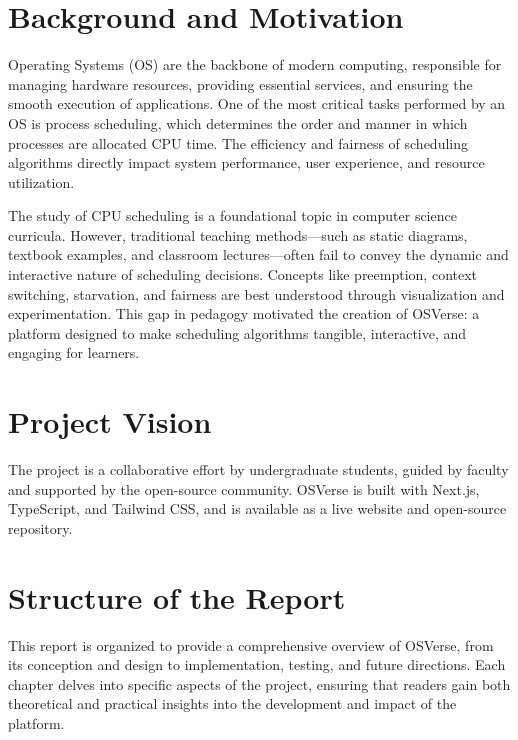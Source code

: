 \documentclass[12pt,a4paper,oneside]{report}
\begin{document}
\section*{Background and Motivation}
Operating Systems (OS) are the backbone of modern computing, responsible for managing hardware resources, providing essential services, and ensuring the smooth execution of applications. One of the most critical tasks performed by an OS is process scheduling, which determines the order and manner in which processes are allocated CPU time. The efficiency and fairness of scheduling algorithms directly impact system performance, user experience, and resource utilization.

The study of CPU scheduling is a foundational topic in computer science curricula. However, traditional teaching methods—such as static diagrams, textbook examples, and classroom lectures—often fail to convey the dynamic and interactive nature of scheduling decisions. Concepts like preemption, context switching, starvation, and fairness are best understood through visualization and experimentation. This gap in pedagogy motivated the creation of OSVerse: a platform designed to make scheduling algorithms tangible, interactive, and engaging for learners.

\section*{Project Vision}


The project is a collaborative effort by undergraduate students, guided by faculty and supported by the open-source community. OSVerse is built with Next.js, TypeScript, and Tailwind CSS, and is available as a live website and open-source repository.

\section*{Structure of the Report}
This report is organized to provide a comprehensive overview of OSVerse, from its conception and design to implementation, testing, and future directions. Each chapter delves into specific aspects of the project, ensuring that readers gain both theoretical and practical insights into the development and impact of the platform.
\end{document}
